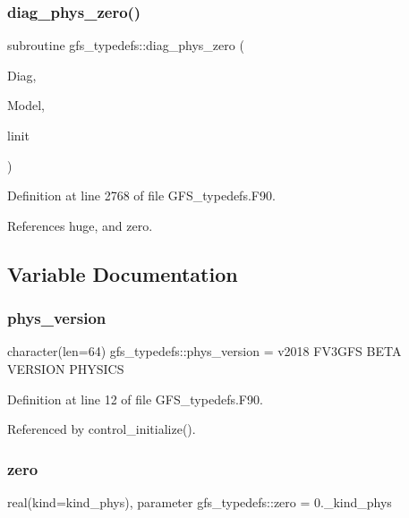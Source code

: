 \subsubsection{diag\+\_\+phys\+\_\+zero()}
{\footnotesize\ttfamily subroutine gfs\+\_\+typedefs\+::diag\+\_\+phys\+\_\+zero (\begin{DoxyParamCaption}\item[{class(\textbf{ gfs\+\_\+diag\+\_\+type})}]{Diag,  }\item[{type(\textbf{ gfs\+\_\+control\+\_\+type}), intent(in)}]{Model,  }\item[{logical, intent(in), optional}]{linit }\end{DoxyParamCaption})}



Definition at line 2768 of file G\+F\+S\+\_\+typedefs.\+F90.



References huge, and zero.



\subsection{Variable Documentation}
\mbox{\label{namespacegfs__typedefs_a789b03371b3c99223aa53b7dbeca9fed}} 
\subsubsection{phys\+\_\+version}
{\footnotesize\ttfamily character(len=64) gfs\+\_\+typedefs\+::phys\+\_\+version = \textquotesingle{}v2018 F\+V3\+G\+FS B\+E\+TA V\+E\+R\+S\+I\+ON P\+H\+Y\+S\+I\+CS\textquotesingle{}}



Definition at line 12 of file G\+F\+S\+\_\+typedefs.\+F90.



Referenced by control\+\_\+initialize().

\mbox{\label{namespacegfs__typedefs_aa849da61ede1dbac0dce77ca0d31df26}} 
\subsubsection{zero}
{\footnotesize\ttfamily real(kind=kind\+\_\+phys), parameter gfs\+\_\+typedefs\+::zero = 0.\+\_\+kind\+\_\+phys}



